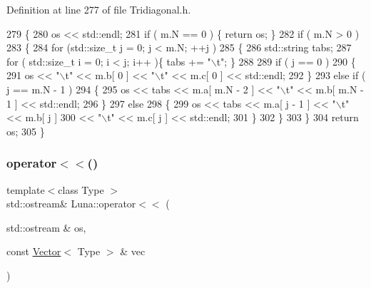 Definition at line 277 of file Tridiagonal.\+h.


\begin{DoxyCode}
279   \{
280     os << std::endl;
281     \textcolor{keywordflow}{if} ( m.N == 0 ) \{ \textcolor{keywordflow}{return} os; \}
282     \textcolor{keywordflow}{if} ( m.N > 0 )
283     \{
284       \textcolor{keywordflow}{for} (std::size\_t j = 0; j < m.N; ++j )
285       \{
286         std::string tabs;
287         \textcolor{keywordflow}{for} ( std::size\_t i = 0; i < j; i++ )\{ tabs += \textcolor{stringliteral}{"\(\backslash\)t"}; \}
288 
289         \textcolor{keywordflow}{if} ( j == 0 )
290         \{
291           os << \textcolor{stringliteral}{"\(\backslash\)t"} << m.b[ 0 ] << \textcolor{stringliteral}{"\(\backslash\)t"} << m.c[ 0 ] << std::endl;
292         \}
293         \textcolor{keywordflow}{else} \textcolor{keywordflow}{if} ( j == m.N - 1 )
294         \{
295           os << tabs << m.a[ m.N - 2 ] << \textcolor{stringliteral}{"\(\backslash\)t"} << m.b[ m.N - 1 ] << std::endl;
296         \}
297         \textcolor{keywordflow}{else}
298         \{
299           os << tabs << m.a[ j - 1 ] << \textcolor{stringliteral}{"\(\backslash\)t"} << m.b[ j ]
300              << \textcolor{stringliteral}{"\(\backslash\)t"} << m.c[ j ] << std::endl;
301         \}
302       \}
303     \}
304     \textcolor{keywordflow}{return} os;
305   \}
\end{DoxyCode}
\mbox{\label{namespaceLuna_aa5f07ae9aef05c499669791c1d719e6e}} 
\subsubsection{\texorpdfstring{operator$<$$<$()}{operator<<()}\hspace{0.1cm}{\footnotesize\ttfamily [4/5]}}
{\footnotesize\ttfamily template$<$class Type $>$ \\
std\+::ostream\& Luna\+::operator$<$$<$ (\begin{DoxyParamCaption}\item[{std\+::ostream \&}]{os,  }\item[{const \hyperlink{classLuna_1_1Vector}{Vector}$<$ Type $>$ \&}]{vec }\end{DoxyParamCaption})\hspace{0.3cm}{\ttfamily [inline]}}




